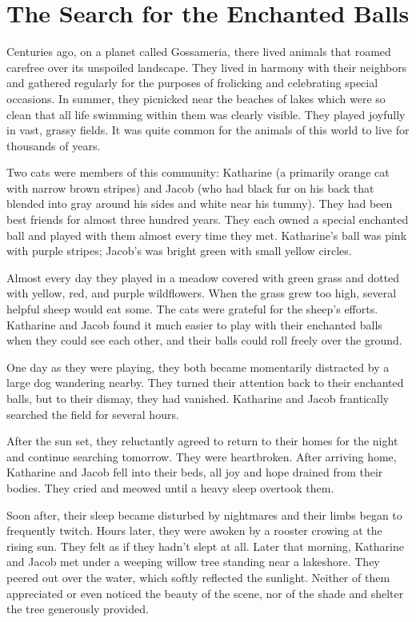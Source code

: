 \chapter{The Search for the Enchanted Balls}

Centuries ago, on a planet called Gossameria, there lived animals that roamed carefree over its unspoiled landscape. They lived in harmony with their neighbors and gathered regularly for the purposes of frolicking and celebrating special occasions. In summer, they picnicked near the beaches of lakes which were so clean that all life swimming within them was clearly visible. They played joyfully in vast, grassy fields. It was quite common for the animals of this world to live for thousands of years.

Two cats were members of this community: Katharine (a primarily orange cat with narrow brown stripes) and Jacob (who had black fur on his back that blended into gray around his sides and white near his tummy). They had been best friends for almost three hundred years. They each owned a special enchanted ball and played with them almost every time they met. Katharine's ball was pink with purple stripes; Jacob's was bright green with small yellow circles.

Almost every day they played in a meadow covered with green grass and dotted with yellow, red, and purple wildflowers. When the grass grew too high, several helpful sheep would eat some. The cats were grateful for the sheep’s efforts. Katharine and Jacob found it much easier to play with their enchanted balls when they could see each other, and their balls could roll freely over the ground.

One day as they were playing, they both became momentarily distracted by a large dog wandering nearby. They turned their attention back to their enchanted balls, but to their dismay, they had vanished. Katharine and Jacob frantically searched the field for several hours.

After the sun set, they reluctantly agreed to return to their homes for the night and continue searching tomorrow. They were heartbroken. After arriving home, Katharine and Jacob fell into their beds, all joy and hope drained from their bodies. They cried and meowed until a heavy sleep overtook them.

Soon after, their sleep became disturbed by nightmares and their limbs began to frequently twitch. Hours later, they were awoken by a rooster crowing at the rising sun. They felt as if they hadn't slept at all. Later that morning, Katharine and Jacob met under a weeping willow tree standing near a lakeshore. They peered out over the water, which softly reflected the sunlight. Neither of them appreciated or even noticed the beauty of the scene, nor of the shade and shelter the tree generously provided.

